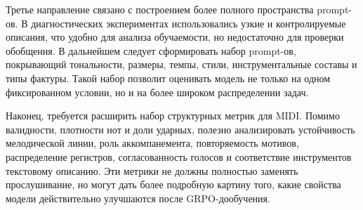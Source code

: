 \documentclass[a4paper,12pt]{extarticle}
\begin{document}
Третье направление связано с построением более полного пространства prompt-ов.
В диагностических экспериментах использовались узкие и контролируемые
описания, что удобно для анализа обучаемости, но недостаточно для проверки
обобщения. В дальнейшем следует сформировать набор prompt-ов, покрывающий
тональности, размеры, темпы, стили, инструментальные составы и типы фактуры.
Такой набор позволит оценивать модель не только на одном фиксированном
условии, но и на более широком распределении задач.

Наконец, требуется расширить набор структурных метрик для MIDI. Помимо
валидности, плотности нот и доли ударных, полезно анализировать устойчивость
мелодической линии, роль аккомпанемента, повторяемость мотивов, распределение
регистров, согласованность голосов и соответствие инструментов текстовому
описанию. Эти метрики не должны полностью заменять прослушивание, но могут
дать более подробную картину того, какие свойства модели действительно
улучшаются после GRPO-дообучения.

\newpage 
\printbibliography[heading=bibintoc] 
\end{document}
